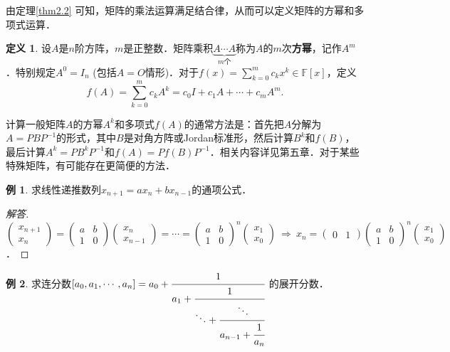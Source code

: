 \documentclass[a4paper,fontset=windows]{ctexbook}
\theoremstyle{definition}
\newtheorem{definition}{定义}[chapter]
\newtheorem{example}{例}[chapter]
\begin{document}
由定理\ref{thm2.2} 可知，矩阵的乘法运算满足结合律，从而可以定义矩阵的方幂和多项式运算．

\begin{definition}
设$A$是$n$阶方阵，$m$是正整数．矩阵乘积$\underbrace{A\cdots A}_{m\text{个}}$称为$A$的$m$次{\bf 方幂}，记作$A^m$．特别规定$A^0=I_n$ (包括$A=O$情形)．对于$f(x)=\sum\limits_{k=0}^mc_kx^k\in\mathbb{F}[x]$，定义
$$f(A)=\sum\limits_{k=0}^mc_kA^k=c_0I+c_1A+\cdots+c_mA^m.$$
\end{definition}

计算一般矩阵$A$的方幂$A^k$和多项式$f(A)$的通常方法是：首先把$A$分解为$A=PBP^{-1}$的形式，其中$B$是对角方阵或Jordan标准形，然后计算$B^k$和$f(B)$，最后计算$A^k=PB^kP^{-1}$和$f(A)=Pf(B)P^{-1}$．相关内容详见第五章．对于某些特殊矩阵，有可能存在更简便的方法．

\begin{example}\label{ex2.7}
求线性递推数列$x_{n+1}=ax_n+bx_{n-1}$的通项公式．
\end{example}

\begin{proof}[解答]
$\begin{pmatrix}x_{n+1} \\ x_n\end{pmatrix}=\begin{pmatrix}a&b \\ 1&0\end{pmatrix}\begin{pmatrix}x_n \\ x_{n-1}\end{pmatrix}=\cdots=\begin{pmatrix}a&b \\ 1&0\end{pmatrix}^n\begin{pmatrix}x_1 \\ x_0\end{pmatrix}~\Rightarrow~x_n=\begin{pmatrix}0&1\end{pmatrix}\begin{pmatrix}a&b \\ 1&0\end{pmatrix}^n\begin{pmatrix}x_1 \\ x_0\end{pmatrix}$．
\end{proof}

\begin{example}
求连分数$[a_0,a_1,\cdots,a_n]=a_0+\cfrac{1}{a_1+\cfrac{1}{\ddots+\cfrac{\ddots}{a_{n-1}+\cfrac{1}{a_n}}}}$ 的展开分数．
\end{example}
\end{document}
